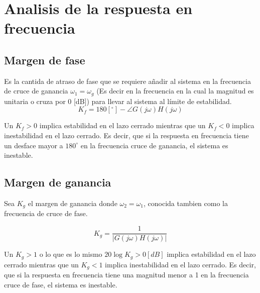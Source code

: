 \documentclass{article}          %
\begin{document}
    
    
    \section{Analisis de la respuesta en frecuencia}
        \subsection{Margen de fase}
            Es la cantida de atraso de fase que se requiere añadir al sistema en la frecuencia de cruce de ganancia $\omega_1=\omega_g$ (Es decir en la frecuencia en la cual la magnitud es unitaria o cruza por 0 [dB]) para llevar al sistema al límite de estabilidad.\\

            \begin{equation}
                K_f = 180 [^\circ] - \angle G(j\omega)H(j\omega)
            \end{equation}

            Un $K_f > 0$ implica estabilidad en el lazo cerrado mientras que un $K_f < 0$ implica inestabilidad en el lazo cerrado. Es decir, que si la respuesta en frecuencia tiene un desface mayor a $180^\circ$ en la frecuencia cruce de ganancia, el sistema es inestable.\\ 

        \subsection{Margen de ganancia}
            Sea $K_g$ el margen de ganancia donde $\omega_2 = \omega_1$, conocida tambien como la frecuencia de cruce de fase.

            \begin{equation}
                K_g = \frac{1}{\lvert G(j\omega)H(j\omega) \rvert}
            \end{equation}

            Un $K_g > 1$ o lo que es lo mismo $20\log{K_g} > 0 [dB]$ implica estabilidad en el lazo cerrado mientras que un $K_g < 1$ implica inestabilidad en el lazo cerrado. Es decir, que si la respuesta en frecuencia tiene una magnitud menor a 1 en la frecuencia cruce de fase, el sistema es inestable.\\
\end{document}
